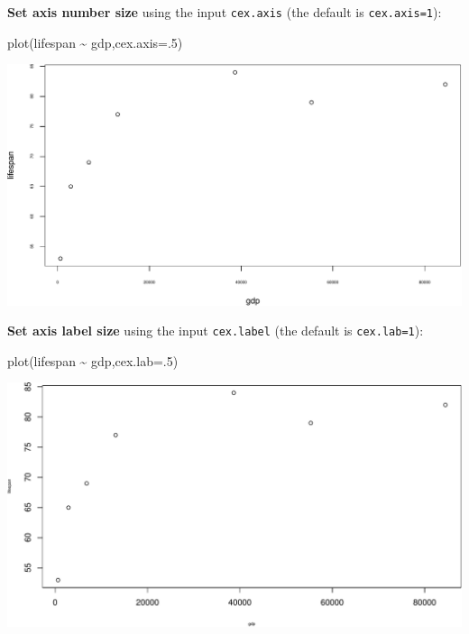 \documentclass[
]{book}
\newenvironment{Shaded}{\begin{snugshade}}{\end{snugshade}}
\newcommand{\AttributeTok}[1]{\textcolor[rgb]{0.77,0.63,0.00}{#1}}
\newcommand{\DecValTok}[1]{\textcolor[rgb]{0.00,0.00,0.81}{#1}}
\newcommand{\FunctionTok}[1]{\textcolor[rgb]{0.00,0.00,0.00}{#1}}
\newcommand{\NormalTok}[1]{#1}
\newcommand{\SpecialCharTok}[1]{\textcolor[rgb]{0.00,0.00,0.00}{#1}}
\begin{document}
\textbf{Set axis number size} using the input \texttt{cex.axis} (the default is \texttt{cex.axis=1}):

\begin{Shaded}
\begin{Highlighting}[]
\FunctionTok{plot}\NormalTok{(lifespan }\SpecialCharTok{\textasciitilde{}}\NormalTok{ gdp,}\AttributeTok{cex.axis=}\NormalTok{.}\DecValTok{5}\NormalTok{)}
\end{Highlighting}
\end{Shaded}

\includegraphics{figures/unnamed-chunk-107-1.pdf}

\textbf{Set axis label size} using the input \texttt{cex.label} (the default is \texttt{cex.lab=1}):

\begin{Shaded}
\begin{Highlighting}[]
\FunctionTok{plot}\NormalTok{(lifespan }\SpecialCharTok{\textasciitilde{}}\NormalTok{ gdp,}\AttributeTok{cex.lab=}\NormalTok{.}\DecValTok{5}\NormalTok{)}
\end{Highlighting}
\end{Shaded}

\includegraphics{figures/unnamed-chunk-108-1.pdf}
\end{document}
